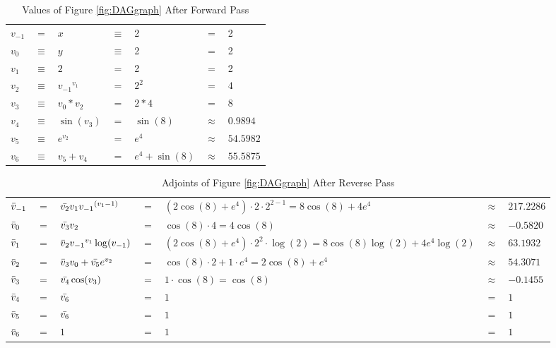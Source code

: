 \documentclass{article}
\begin{document}
\begin{table}[h!]
    \centering
    \begin{tabular}{|lclllcl|}
        \hline
        $v_{-1}$ & $=$ & $x$ & $\equiv$ & 2 & $=$ & 2\\
        $v_{0}$ & $\equiv$ & $y$ & $\equiv$ & 2 & $=$ & 2\\
        \hline
        $v_{1}$ & $\equiv$ & $2$ & $=$ & 2 & $=$ & 2\\
        $v_{2}$ & $\equiv$ & ${v_{-1}}^{v_{1}}$ & $=$ & $ 2^2$ & $=$ & $4$\\
        $v_{3}$ & $\equiv$ & $v_0 * v_2$ & $=$ & $ 2 * 4$ & $=$ & $8$\\
        $v_{4}$ & $\equiv$ & $\sin(v_3)$ & $=$ & $\sin(8)$ & $\approx$ & $0.9894$\\
        $v_{5}$ & $\equiv$ & $e^{v_2}$ & $=$ & $ e^4$ & $\approx$ & $54.5982$\\
        \hline
        $v_{6}$ & $\equiv$ & $v_5 + v_4$ & $=$ & $e^4 + \sin(8)$ & $\approx$ & $55.5875$\\
        \hline
    \end{tabular}
    \caption{Values of Figure \ref{fig:DAGgraph} After Forward Pass}
    \label{tab:example1FP}
\end{table}


\begin{table}[h!]
    \centering
    \begin{tabular}{|lclllll|}
        \hline
        $\Bar{v}_{-1}$ & $=$ & $\Bar{v_2}v_1 {v_{-1}}^{(v_{1}-1)}$ & $=$ & $(2\cos(8)+e^4) \cdot 2 \cdot 2^{2-1} = 8\cos(8)+4e^4$ & $\approx$ & $217.2286$\\
        $\Bar{v}_{0}$ & $=$ & $\Bar{v_3}v_2$ & $=$ & $\cos(8)\cdot4 = 4\cos(8)$ & $\approx$ & $-0.5820$\\
        \hline
        $\Bar{v}_{1}$ & $=$ & $\Bar{v}_{2}{v_{-1}}^{v_{1}}\log(v_{-1})$ & $=$ & $(2\cos(8)+e^4) \cdot 2^2 \cdot \log(2) = 8\cos(8)\log(2) +4e^4\log(2)$ & $\approx$ & $63.1932$\\
        $\Bar{v}_{2}$ & $=$ & $\Bar{v}_{3}v_0 + \Bar{v_5}e^{v_2}$ & $=$ & $\cos(8) \cdot 2 + 1 \cdot e^{4} = 2\cos(8)+e^4$ & $\approx$ & $54.3071$\\
        $\Bar{v}_{3}$ & $=$ & $\Bar{v_4}\cos(v_3)$ & $=$ & $1 \cdot \cos(8) = \cos(8)$ & $\approx$ & $-0.1455$\\
        $\Bar{v}_{4}$ & $=$ & $\Bar{v_6}$ & $=$ & $1$ & $=$ & $1$\\
        $\Bar{v}_{5}$ & $=$ & $\Bar{v_6}$ & $=$ & $1$ & $=$ & $1$\\
        \hline
        $\Bar{v}_{6}$ & $=$ & $1$ & $=$ & $1$ & $=$ & $1$\\
        \hline
    \end{tabular}
    \caption{Adjoints of Figure \ref{fig:DAGgraph} After Reverse Pass}
    \label{tab:example1RP}
\end{table}
\end{document}
